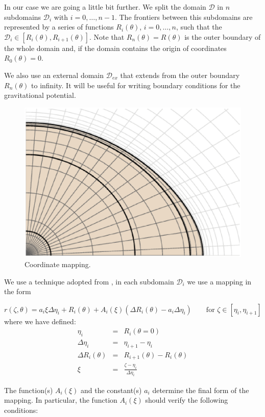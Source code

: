 In our case we are going a little bit further. We split
the domain $\mathcal{D}$ in $n$ subdomains $\mathcal{D}_i$ with
$i=0,\ldots,n-1$. The frontiers between this subdomains are represented
by a series of functions $R_i(\theta)$, $i=0,\ldots,n$, such that
the $\mathcal{D}_i\in[R_{i}(\theta),R_{i+1}(\theta)]$.  Note that
$R_n(\theta)=R(\theta)$ is the outer boundary of the whole domain and,
if the domain contains the origin of coordinates $R_0(\theta)=0$.

We also use an external domain $\mathcal{D}_{ex}$ that extends from the
outer boundary $R_n(\theta)$ to infinity. It will be useful for writing
boundary conditions for the gravitational potential.

\begin{figure}[t]
\centering
\includegraphics[width=0.8\linewidth]{fig/mapping.ps}
\caption{Coordinate mapping.}
\end{figure}


We use a technique adopted from \cite{BGM98}, in each subdomain
$\mathcal{D}_i$ we use a mapping in the form

\begin{equation}
\label{eq:map}
r(\zeta,\theta)=a_i\xi\Delta\eta_i+R_i(\theta)+A_i(\xi)(\Delta R_i(\theta)-a_i\Delta\eta_i) 
\qquad \mbox{for $\zeta\in[\eta_i,\eta_{i+1}]$}
\end{equation}
where we have defined:
\begin{eqnarray*}
\eta_i&=&R_i(\theta=0)\\
\Delta\eta_i&=&\eta_{i+1}-\eta_i\\
\Delta R_i(\theta)&=&R_{i+1}(\theta)-R_{i}(\theta)\\
\xi&=&\displaystyle\frac{\zeta-\eta_i}{\Delta\eta_i}
\end{eqnarray*} 

The function(s) $A_i(\xi)$ and the constant(s) $a_i$ determine the final
form of the mapping. In particular, the function $A_i(\xi)$ should verify
the following conditions:

